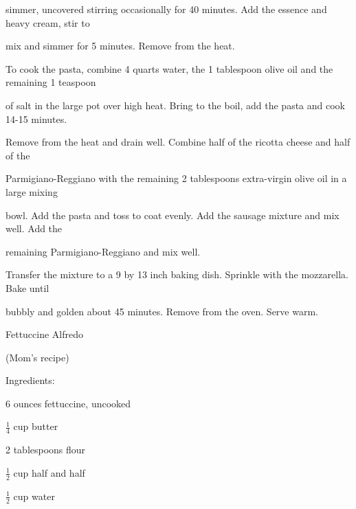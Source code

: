 \documentclass[a4paper,portrait,12pt]{book}
\begin{document}
simmer, uncovered stirring occasionally for 40 minutes. Add the essence and heavy cream, stir to




mix and simmer for 5 minutes. Remove from the heat.




To cook the pasta, combine 4 quarts water, the 1 tablespoon olive oil and the remaining 1 teaspoon




of salt in the large pot over high heat. Bring to the boil, add the pasta and cook 14-15 minutes.




Remove from the heat and drain well. Combine half of the ricotta cheese and half of the




Parmigiano-Reggiano with the remaining 2 tablespoons extra-virgin olive oil in a large mixing




bowl. Add the pasta and toss to coat evenly. Add the sausage mixture and mix well. Add the




remaining Parmigiano-Reggiano and mix well.




Transfer the mixture to a 9 by 13 inch baking dish. Sprinkle with the mozzarella. Bake until




bubbly and golden about 45 minutes. Remove from the oven. Serve warm.







\newpage
Fettuccine Alfredo




(Mom's recipe)




Ingredients:




6 ounces fettuccine, uncooked




$\frac{1}{4}$ cup butter




2 tablespoons flour




$\frac{1}{2}$ cup half and half




$\frac{1}{2}$ cup water
\end{document}

